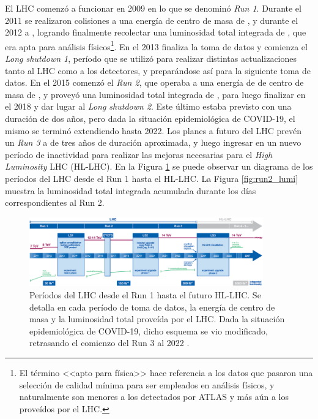 El LHC comenzó a funcionar en 2009 en lo que se denominó \textit{Run 1}. Durante el 2011 se realizaron colisiones a una energía de centro de masa de , y durante el 2012 a , logrando finalmente recolectar una luminosidad total integrada de  \cite{DAPR-2011-01,DAPR-2013-01}, que era apta para análisis físicos\footnote{El término <<apto para física>> hace referencia a los datos que pasaron una selección de calidad mínima para ser empleados en análisis físicos, y naturalmente son menores a los detectados por ATLAS y más aún a los proveídos por el LHC.}. En el 2013 finaliza la toma de datos y comienza el \textit{Long shutdown 1}, período que se utilizó para realizar distintas actualizaciones tanto al LHC como a los detectores, y preparándose así para la siguiente toma de datos. En el 2015 comenzó el \textit{Run 2}, que operaba a una energía de de centro de masa de , y proveyó una luminosidad total integrada de  \cite{lumi_13tev}, para luego finalizar en el 2018 y dar lugar al \textit{Long shutdown 2}. Este último estaba previsto con una duración de dos años, pero dada la situación epidemiológica de COVID-19, el mismo se terminó extendiendo hasta 2022.
Los planes a futuro del LHC prevén un \textit{Run 3} a  de tres años de duración aproximada, y luego ingresar en un nuevo período de inactividad para realizar las mejoras necesarias para el \textit{High Luminosity} LHC (HL-LHC). En la Figura \ref{fig:lhc_periods} se puede observar un diagrama de los períodos del LHC desde el Run 1 hasta el HL-LHC. La Figura \ref{fig:run2_lumi} muestra la luminosidad total integrada acumulada durante los días correspondientes al Run 2.

\begin{figure}
  \centering
  \includegraphics[width=0.9\textwidth]{images/lhc/lhc_periods.png}
  \caption{Períodos del LHC desde el Run 1 hasta el futuro HL-LHC. Se detalla en cada período de toma de datos, la energía de centro de masa y la luminosidad total proveída por el LHC. Dada la situación epidemiológica de COVID-19, dicho esquema se vio modificado, retrasando el comienzo del Run 3 al 2022 \cite{lhc_periods}.}
  \label{fig:lhc_periods}
\end{figure}


